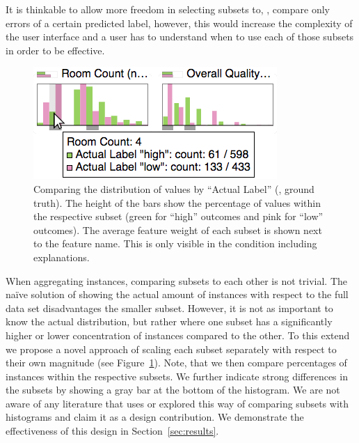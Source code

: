 It is thinkable to allow more freedom in selecting subsets to, \eg, compare only errors of a certain predicted label, however, this would increase the complexity of the user interface and a user has to understand when to use each of those subsets in order to be effective.

\begin{figure}
\centering
\includegraphics[width=0.9\linewidth]{aggexplain/histogram}
\caption{
Comparing the distribution of values by ``Actual Label'' (\ie, ground truth).
The height of the bars show the percentage of values within the respective subset (green for ``high'' outcomes and pink for ``low'' outcomes).
The average feature weight of each subset is shown next to the feature name.
This is only visible in the condition including explanations.
}
\label{figs:histogram}
\end{figure}

When aggregating instances, comparing subsets to each other is not trivial.
The na\"ive solution of showing the actual amount of instances with respect to the full data set disadvantages the smaller subset.
However, it is not as important to know the actual distribution, but rather where one subset has a significantly higher or lower concentration of instances compared to the other.
To this extend we propose a novel approach of scaling each subset separately with respect to their own magnitude (see Figure~\ref{figs:histogram}).
Note, that we then compare percentages of instances within the respective subsets.
We further indicate strong differences in the subsets by showing a gray bar at the bottom of the histogram.
We are not aware of any literature that uses or explored this way of comparing subsets with histograms and claim it as a design contribution.
We demonstrate the effectiveness of this design in Section~\ref{sec:results}.

